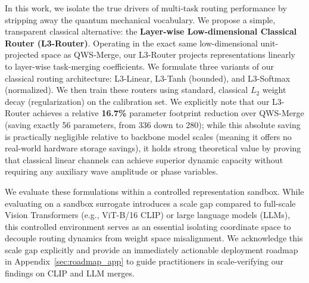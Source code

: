In this work, we isolate the true drivers of multi-task routing performance by stripping away the quantum mechanical vocabulary. We propose a simple, transparent classical alternative: the \textbf{Layer-wise Low-dimensional Classical Router (L3-Router)}. Operating in the exact same low-dimensional unit-projected space as QWS-Merge, our L3-Router projects representations linearly to layer-wise task-merging coefficients. We formulate three variants of our classical routing architecture: L3-Linear, L3-Tanh (bounded), and L3-Softmax (normalized). We then train these routers using standard, classical $L_2$ weight decay (regularization) on the calibration set. We explicitly note that our L3-Router achieves a relative \textbf{16.7\%} parameter footprint reduction over QWS-Merge (saving exactly 56 parameters, from 336 down to 280); while this absolute saving is practically negligible relative to backbone model scales (meaning it offers no real-world hardware storage savings), it holds strong theoretical value by proving that classical linear channels can achieve superior dynamic capacity without requiring any auxiliary wave amplitude or phase variables.

We evaluate these formulations within a controlled representation sandbox. While evaluating on a sandbox surrogate introduces a scale gap compared to full-scale Vision Transformers (e.g., ViT-B/16 CLIP) or large language models (LLMs), this controlled environment serves as an essential isolating coordinate space to decouple routing dynamics from weight space misalignment. We acknowledge this scale gap explicitly and provide an immediately actionable deployment roadmap in Appendix~\ref{sec:roadmap_app} to guide practitioners in scale-verifying our findings on CLIP and LLM merges.

